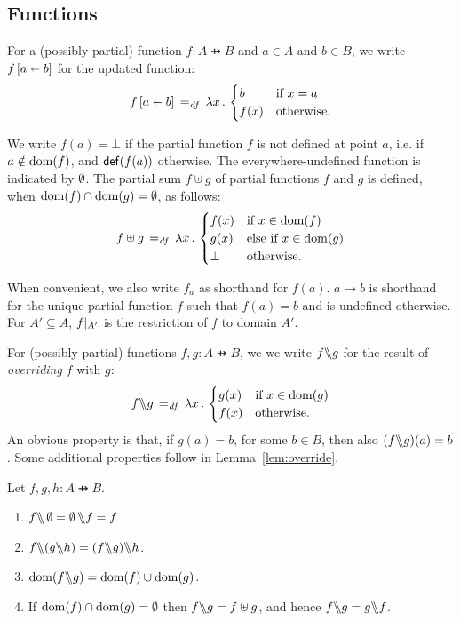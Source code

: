 \documentclass[11pt]{report}         %
\begin{document}
\subsection{Functions}
\label{sec:functions}

For a (possibly partial) function $f : A \pfun B$ and $a \in A$ and $b \in B$, we write $f \left[ a \shortleftarrow b \right]$ for the updated function: \[ f \left[ a \shortleftarrow b \right] \operatorname{\;=_{\mathit{df}}\;} \lambda x\,.\, \begin{cases}
  b & \text{if $x = a$} \\
  f(x) & \text{otherwise.}
\end{cases}\] 

We write $f(a) = \bot$ if the partial function $f$ is not defined at point $a$, i.e. if $a \notin \operatorname{\mathrm{dom}}(f)$, and $\mathsf{def}(f(a))$ otherwise. The everywhere-undefined function is indicated by $\operatorname{\emptyset}$. The partial sum $f \uplus g$ of partial functions $f$ and $g$ is defined, when $\operatorname{\mathrm{dom}}(f) \cap \operatorname{\mathrm{dom}}(g) = \operatorname{\emptyset}$, as follows: \[ f \uplus g \operatorname{\;=_{\mathit{df}}\;} \lambda x\,.\,\begin{cases}
    f(x) & \text{if $x \in \operatorname{\mathrm{dom}}(f)$} \\
    g(x) & \text{else if $x \in \operatorname{\mathrm{dom}}(g)$} \\
    \bot & \text{otherwise.}
\end{cases}\]

 When convenient, we also write $f_a$ as shorthand for $f(a)$. $a \mapsto b$ is shorthand for the unique partial function $f$ such that $f(a) = b$ and is undefined otherwise. For $A' \subseteq A$, $f |_{A'}$ is the restriction of $f$ to domain $A'$. 

For (possibly partial) functions $f,g : A \pfun B$, we we write $f \backslash\!\!\backslash g$ for the result of \emph{overriding} $f$ with $g$: \[ f \backslash\!\!\backslash g \operatorname{\;=_{\mathit{df}}\;} \lambda x\,.\, \begin{cases}
  g(x) & \text{if $x \in \operatorname{\mathrm{dom}}(g)$} \\
  f(x) & \text{otherwise.}
\end{cases} \] An obvious property is that, if $g(a) = b$, for some $b \in B$, then also $(f \backslash\!\!\backslash g)(a) = b$. Some additional properties follow in Lemma~\ref{lem:override}. 

\begin{proposition}
    \label{lem:override}
    Let $f,g,h : A \pfun B$. 
    \begin{enumerate}
        \item $f \backslash\!\!\backslash \operatorname{\emptyset} = \operatorname{\emptyset} \backslash\!\!\backslash f = f$
        \item $f \override (g \override h) = (f \override g) \override h$. 
        \item $\operatorname{\mathrm{dom}}(f \backslash\!\!\backslash g) = \operatorname{\mathrm{dom}}(f) \cup \operatorname{\mathrm{dom}}(g)$. 
        \item If $\operatorname{\mathrm{dom}}(f) \cap \operatorname{\mathrm{dom}}(g) = \operatorname{\emptyset}$ then $f \backslash\!\!\backslash g = f \uplus g$, and hence $f \backslash\!\!\backslash g = g \backslash\!\!\backslash f$. 
    \end{enumerate}
\end{proposition}
\end{document}
